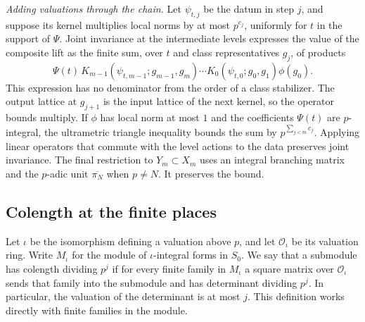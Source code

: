 \emph{Adding valuations through the chain.}
Let \(\psi_{t,j}\) be the datum in step \(j\), and suppose its kernel
multiplies local norms by at most \(p^{c_j}\), uniformly for
\(t\) in the support of \(\Psi\).
Joint invariance at the intermediate levels expresses the value
of the composite lift as the finite sum, over \(t\) and class
representatives \(g_j\), of products
\[
  \Psi(t)\,K_{m-1}(\psi_{t,m-1};g_{m-1},g_m)
        \cdots K_0(\psi_{t,0};g_0,g_1)\phi(g_0).
\]
This expression has no denominator from the order of a class stabilizer.
The output lattice at \(g_{j+1}\) is the input lattice of the next
kernel, so the operator bounds multiply. If \(\phi\) has local norm
at most \(1\) and the coefficients \(\Psi(t)\) are \(p\)-integral,
the ultrametric triangle inequality bounds the sum by
\(p^{\sum_{j<m}c_j}\). Applying linear operators that commute with
the level actions to the data preserves joint invariance.
The final restriction to \(Y_m\subset X_m\) uses an integral branching
matrix and the \(p\)-adic unit \(\overline{\pi_N}\) when \(p\ne N\).
It preserves the bound.

\subsection{Colength at the finite places}

Let \(\iota\) be the isomorphism defining a valuation above \(p\), and let
\(\mathcal O_\iota\) be its valuation ring. Write \(M_\iota\) for the
module of \(\iota\)-integral forms in \(S_0\).
We say that a submodule has colength dividing \(p^j\) if for every finite
family in \(M_\iota\) a square matrix over \(\mathcal O_\iota\) sends that
family into the submodule and has determinant dividing \(p^j\).
In particular, the valuation of the determinant is at most \(j\).
This definition works directly with finite families in the module.

